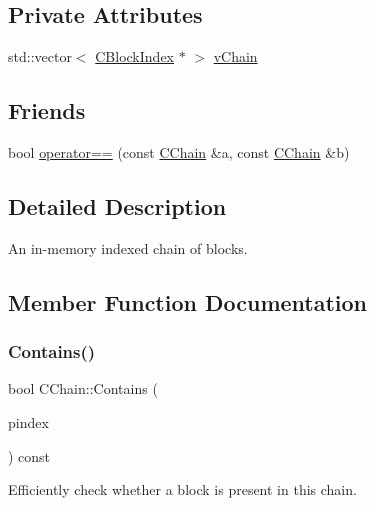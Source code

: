 \subsection*{Private Attributes}
\begin{DoxyCompactItemize}
\item 
std\+::vector$<$ \mbox{\hyperlink{class_c_block_index}{C\+Block\+Index}} $\ast$ $>$ \mbox{\hyperlink{class_c_chain_adc8fa3eb698fb5985c7b39daf6bbf708}{v\+Chain}}
\end{DoxyCompactItemize}
\subsection*{Friends}
\begin{DoxyCompactItemize}
\item 
bool \mbox{\hyperlink{class_c_chain_a0e46ed4192afeafb8d420b2d6d9bb24c}{operator==}} (const \mbox{\hyperlink{class_c_chain}{C\+Chain}} \&a, const \mbox{\hyperlink{class_c_chain}{C\+Chain}} \&b)
\end{DoxyCompactItemize}


\subsection{Detailed Description}
An in-\/memory indexed chain of blocks. 

\subsection{Member Function Documentation}
\mbox{\label{class_c_chain_af1786dc229c215dea7f727c11df2c8dc}} 
\subsubsection{\texorpdfstring{Contains()}{Contains()}}
{\footnotesize\ttfamily bool C\+Chain\+::\+Contains (\begin{DoxyParamCaption}\item[{const \mbox{\hyperlink{class_c_block_index}{C\+Block\+Index}} $\ast$}]{pindex }\end{DoxyParamCaption}) const\hspace{0.3cm}{\ttfamily [inline]}}

Efficiently check whether a block is present in this chain. \mbox{\label{class_c_chain_adb9ec01329511e869bba95e3c143da71}} 
